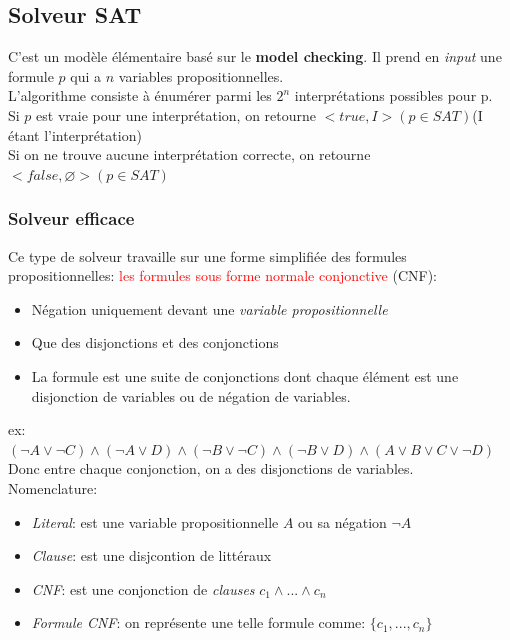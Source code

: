 \documentclass{report}
\begin{document}
\subsection{Solveur SAT}
C'est un modèle élémentaire basé sur le \textbf{model checking}. Il prend en \textit{input} une formule $p$ qui a $n$ variables propositionnelles.\\
L'algorithme consiste à énumérer parmi les $2^n$ interprétations possibles pour p.\\
Si $p$ est vraie pour une interprétation, on retourne $<true,I> (p\in SAT)$(I étant l'interprétation)\\
Si on ne trouve aucune interprétation correcte, on retourne $<false, \varnothing> (p \in SAT)$\\

\subsubsection{Solveur efficace}
Ce type de solveur travaille sur une forme simplifiée des formules propositionnelles: \textcolor{red}{les formules sous forme normale conjonctive} (CNF):
\begin{itemize}
\item Négation uniquement devant une \textit{variable propositionnelle}
\item Que des disjonctions et des conjonctions
\item La formule est une suite de conjonctions dont chaque élément est une disjonction de variables ou de négation de variables.
\end{itemize}
ex: $(\neg A \vee \neg C) \wedge ( \neg A \vee D) \wedge (\neg B \vee \neg C) \wedge (\neg B \vee D) \wedge (A \vee B \vee C \vee \neg D)$ Donc entre chaque conjonction, on a des disjonctions de variables.\\
Nomenclature:
\begin{itemize}
\item \textit{Literal}: est une variable propositionnelle $A$ ou sa négation $\neg A$
\item \textit{Clause}: est une disjcontion de littéraux
\item \textit{CNF}: est une conjonction de \textit{clauses} $c_1 \wedge ... \wedge c_n$
\item \textit{Formule CNF}: on représente une telle formule comme: $\{c_1, ..., c_n \}$
\end{itemize}
\end{document}
